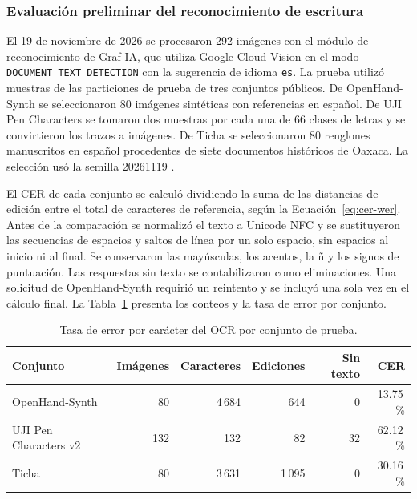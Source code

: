 \subsubsection{Evaluación preliminar del reconocimiento de escritura}
\label{sec:resultados-cer}

El 19 de noviembre de 2026 se procesaron 292 imágenes con el módulo de reconocimiento de Graf-IA, que utiliza Google Cloud Vision en el modo \texttt{DOCUMENT\_TEXT\_DETECTION} con la sugerencia de idioma \texttt{es}. La prueba utilizó muestras de las particiones de prueba de tres conjuntos públicos. De OpenHand-Synth se seleccionaron 80 imágenes sintéticas con referencias en español. De UJI Pen Characters se tomaron dos muestras por cada una de 66 clases de letras y se convirtieron los trazos a imágenes. De Ticha se seleccionaron 80 renglones manuscritos en español procedentes de siete documentos históricos de Oaxaca. La selección usó la semilla 20261119 \cite{openhandSynthDataset,ujiPenCharactersV2,tichaManuscriptLines}.

El CER de cada conjunto se calculó dividiendo la suma de las distancias de edición entre el total de caracteres de referencia, según la Ecuación~\eqref{eq:cer-wer}. Antes de la comparación se normalizó el texto a Unicode NFC y se sustituyeron las secuencias de espacios y saltos de línea por un solo espacio, sin espacios al inicio ni al final. Se conservaron las mayúsculas, los acentos, la ñ y los signos de puntuación. Las respuestas sin texto se contabilizaron como eliminaciones. Una solicitud de OpenHand-Synth requirió un reintento y se incluyó una sola vez en el cálculo final. La Tabla~\ref{tab:resultados-cer} presenta los conteos y la tasa de error por conjunto.

\begin{table}[htbp]
\centering
\caption{Tasa de error por carácter del OCR por conjunto de prueba.}
\label{tab:resultados-cer}
\renewcommand{\arraystretch}{1.2}
\begin{tabular}{@{}lrrrrr@{}}
\toprule
Conjunto & Imágenes & Caracteres & Ediciones & Sin texto & CER \\
\midrule
OpenHand-Synth & 80 & 4\,684 & 644 & 0 & 13.75\,\% \\
UJI Pen Characters v2 & 132 & 132 & 82 & 32 & 62.12\,\% \\
Ticha & 80 & 3\,631 & 1\,095 & 0 & 30.16\,\% \\
\bottomrule
\end{tabular}
\end{table}

